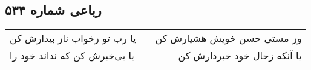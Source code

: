 \begin{center}
\section*{رباعی شماره ۵۳۴}
\label{sec:sh534}
\begin{longtable}{l p{0.5cm} r}
یا رب تو زخواب ناز بیدارش کن
&&
وز مستی حسن خویش هشیارش کن
\\
یا بی‌خبرش کن که نداند خود را
&&
یا آنکه زحال خود خبردارش کن
\\
\end{longtable}
\end{center}
